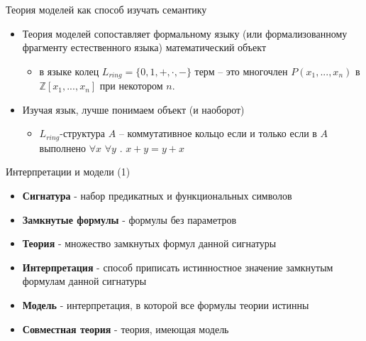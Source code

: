 \documentclass{beamer}
\begin{document}

\begin{frame}{Теория моделей как способ изучать семантику}
\setcounter{framenumber}{1}
\begin{itemize}
  \item Теория моделей сопоставляет формальному языку (или формализованному фрагменту естественного языка) математический объект
    \begin{itemize}
      \item в языке колец $L_{ring} = \{0, 1, +, \cdot, -\}$ терм -- это многочлен $P(x_1, ..., x_n)$ в $\mathbb{Z}[x_1, ..., x_n]$ при некотором $n$.
    \end{itemize}
  \item Изучая язык, лучше понимаем объект (и наоборот)
    \begin{itemize}
      \item $L_{ring}$-структура $A$ -- коммутативное кольцо если и только если в $A$ выполнено $\forall x$ $\forall y$ . $x + y = y + x$
    \end{itemize}
\end{itemize}
\end{frame}

\begin{frame}{Интерпретации и модели (1)}
\begin{itemize}
  \item \textbf{Сигнатура} - набор предикатных и функциональных символов
  \item \textbf{Замкнутые формулы} - формулы без параметров
  \item \textbf{Теория} - множество замкнутых формул данной сигнатуры
  \item \textbf{Интерпретация} - способ приписать истинностное значение замкнутым формулам данной сигнатуры
  \item \textbf{Модель} - интерпретация, в которой все формулы теории истинны
  \item \textbf{Совместная теория} - теория, имеющая модель
\end{itemize}
\end{frame}
\end{document}
